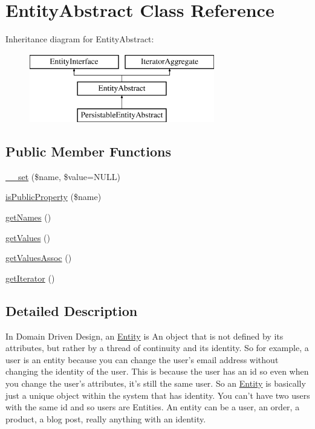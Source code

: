 \hypertarget{class_pes_1_1_entity_1_1_entity_abstract}{}\section{Entity\+Abstract Class Reference}
\label{class_pes_1_1_entity_1_1_entity_abstract}
Inheritance diagram for Entity\+Abstract\+:\begin{figure}[H]
\begin{center}
\leavevmode
\includegraphics[height=3.000000cm]{class_pes_1_1_entity_1_1_entity_abstract}
\end{center}
\end{figure}
\subsection*{Public Member Functions}
\begin{DoxyCompactItemize}
\item 
\mbox{\hyperlink{class_pes_1_1_entity_1_1_entity_abstract_a9ee444ac6f563fe13f868c7a4d96f013}{\+\_\+\+\_\+set}} (\$name, \$value=N\+U\+LL)
\item 
\mbox{\hyperlink{class_pes_1_1_entity_1_1_entity_abstract_aa232b7b1d48256769082d3351dfd5001}{is\+Public\+Property}} (\$name)
\item 
\mbox{\hyperlink{class_pes_1_1_entity_1_1_entity_abstract_a64e8191090bf560e825966b082e868f0}{get\+Names}} ()
\item 
\mbox{\hyperlink{class_pes_1_1_entity_1_1_entity_abstract_a70a0fe08035189260c72e32a9e20d30c}{get\+Values}} ()
\item 
\mbox{\hyperlink{class_pes_1_1_entity_1_1_entity_abstract_a8b5c943485575ffd0388c24998990e22}{get\+Values\+Assoc}} ()
\item 
\mbox{\hyperlink{class_pes_1_1_entity_1_1_entity_abstract_a7a9f937c2958e6f4dd7b030f86fb70b7}{get\+Iterator}} ()
\end{DoxyCompactItemize}


\subsection{Detailed Description}
In Domain Driven Design, an \mbox{\hyperlink{namespace_pes_1_1_entity}{Entity}} is An object that is not defined by its attributes, but rather by a thread of continuity and its identity. So for example, a user is an entity because you can change the user’s email address without changing the identity of the user. This is because the user has an id so even when you change the user’s attributes, it’s still the same user. So an \mbox{\hyperlink{namespace_pes_1_1_entity}{Entity}} is basically just a unique object within the system that has identity. You can’t have two users with the same id and so users are Entities. An entity can be a user, an order, a product, a blog post, really anything with an identity.

